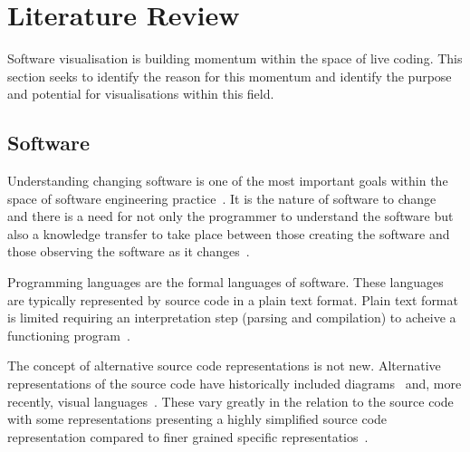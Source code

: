 
\chapter{Literature Review}

Software visualisation is building momentum within the space of live coding. This section seeks to identify the reason for this momentum and identify the purpose and potential for visualisations within this field.


\section{Software}

Understanding changing software is one of the most important goals within the space of software engineering practice~\cite{Tao2012}. It is the nature of software to change~\cite{Purushothaman2005} and there is a need for not only the programmer to understand the software but also a knowledge transfer to take place between those creating the software and those observing the software as it changes~.

Programming languages are the formal languages of software. These languages are typically represented by source code in a plain text format. Plain text format is limited requiring an interpretation step (parsing and compilation) to acheive a functioning program~\cite{Badros2000}.

The concept of alternative source code representations is not new. Alternative representations of the source code have historically included diagrams~ and, more recently, visual languages~. These vary greatly in the relation to the source code with some representations presenting a highly simplified source code representation compared to finer grained specific representatios~.

